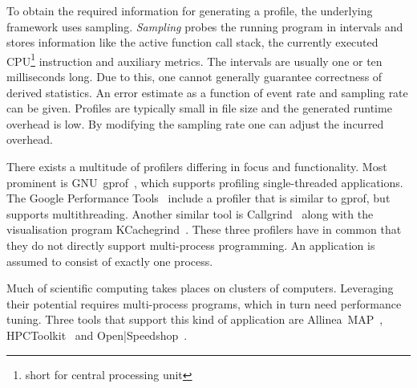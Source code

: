 \documentclass[a4paper, final, diplominf]{zih-template}
\begin{document}
To obtain the required information for generating a profile, the underlying framework uses sampling.
\emph{Sampling} probes the running program in intervals and stores information like the active function call stack, the currently executed CPU\footnote{short for central processing unit} instruction and auxiliary metrics.
The intervals are usually one or ten milliseconds long.
Due to this, one cannot generally guarantee correctness of derived statistics.
An error estimate as a function of event rate and sampling rate can be given.
Profiles are typically small in file size and the generated runtime overhead is low.
By modifying the sampling rate one can adjust the incurred overhead.

There exists a multitude of profilers differing in focus and functionality.
Most prominent is GNU~gprof~\cite{graham82}, which supports profiling single-threaded applications.
The Google Performance Tools~\cite{googleperftools} include a profiler that is similar to gprof, but supports multithreading.
Another similar tool is Callgrind~\cite{callgrind} along with the visualisation program KCachegrind~\cite{weidendorfer08}.
These three profilers have in common that they do not directly support multi-process programming.
An application is assumed to consist of exactly one process.

Much of scientific computing takes places on clusters of computers.
Leveraging their potential requires multi-process programs, which in turn need performance tuning.
Three tools that support this kind of application are Allinea~MAP~\cite{allineamap}, HPCToolkit~\cite{adhianto10} and Open|Speedshop~\cite{schulz08}.
\end{document}
